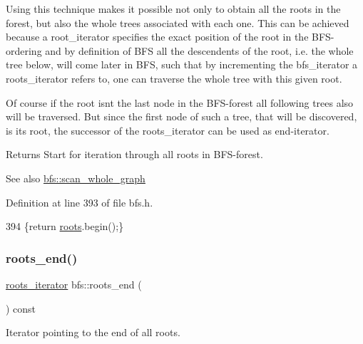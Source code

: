 Using this technique makes it possible not only to obtain all the roots in the forest, but also the whole trees associated with each one. This can be achieved because a {\ttfamily root\+\_\+iterator} specifies the exact position of the root in the B\+F\+S-\/ordering and by definition of B\+FS all the descendents of the root, i.\+e. the whole tree below, will come later in B\+FS, such that by incrementing the {\ttfamily bfs\+\_\+iterator} a {\ttfamily roots\+\_\+iterator} refers to, one can traverse the whole tree with this given root.

Of course if the root isn\textquotesingle{}t the last node in the B\+F\+S-\/forest all following trees also will be traversed. But since the first node of such a tree, that will be discovered, is its root, the successor of the {\ttfamily roots\+\_\+iterator} can be used as end-\/iterator.

\begin{DoxyReturn}{Returns}
Start for iteration through all roots in B\+F\+S-\/forest. 
\end{DoxyReturn}
\begin{DoxySeeAlso}{See also}
\mbox{\hyperlink{classbfs_a25fc51b1bfbbdd3afefe0a84c1bd2f6b}{bfs\+::scan\+\_\+whole\+\_\+graph}} 
\end{DoxySeeAlso}


Definition at line 393 of file bfs.\+h.


\begin{DoxyCode}
394     \{\textcolor{keywordflow}{return} \mbox{\hyperlink{classbfs_acea071a6fdad8e590b40830ced241824}{roots}}.begin();\}
\end{DoxyCode}
\mbox{\label{classbfs_ac84b90f777adeb90390689db62602d73}} 
\subsubsection{\texorpdfstring{roots\+\_\+end()}{roots\_end()}}
{\footnotesize\ttfamily \mbox{\hyperlink{classbfs_a70b915179053a2993154614d4358fdc1}{roots\+\_\+iterator}} bfs\+::roots\+\_\+end (\begin{DoxyParamCaption}{ }\end{DoxyParamCaption}) const\hspace{0.3cm}{\ttfamily [inline]}}



Iterator pointing to the end of all roots. 

